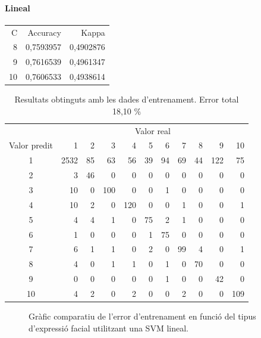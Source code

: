 \documentclass[a4paper]{article}
\begin{document}
\paragraph{Lineal}

\begin{table}[H]
	\centering
	\def\arraystretch{1.2}
	\begin{tabular}{|rrr|}
		\hline
		C & Accuracy & Kappa \\
		8 & 0,7593957 & 0,4902876 \\
		\rowcolor{Orange!40}
		9 & 0,7616539 & 0,4961347 \\
		10 & 0,7606533 & 0,4938614 \\
		\hline
	\end{tabular}
\end{table}

\begin{table}[H]
	\centering
	\def\arraystretch{1.2}
	\begin{tabular}{|c|rrrrrrrrrr|}
		\hline
		& \multicolumn{10}{c|}{Valor real} \\
		Valor predit & 1 & 2 & 3 & 4 & 5 & 6 & 7 & 8 & 9 & 10 \\
		\hline
		1 & 2532 & 85 & 63 & 56 & 39 & 94 & 69 & 44 & 122 & 75 \\
		2 & 3 & 46 & 0 & 0 & 0 & 0 & 0 & 0 & 0 & 0 \\
		3 & 10 & 0 & 100 & 0 & 0 & 1 & 0 & 0 & 0 & 0 \\
		4 & 10 & 2 & 0 & 120 & 0 & 0 & 1 & 0 & 0 & 1 \\
		5 & 4 & 4 & 1 & 0 & 75 & 2 & 1 & 0 & 0 & 0 \\
		6 & 1 & 0 & 0 & 0 & 1 & 75 & 0 & 0 & 0 & 0 \\
		7 & 6 & 1 & 1 & 0 & 2 & 0 & 99 & 4 & 0 & 1 \\
		8 & 4 & 0 & 1 & 1 & 0 & 1 & 0 & 70 & 0 & 0 \\
		9 & 0 & 0 & 0 & 0 & 0 & 1 & 0 & 0 & 42 & 0 \\
		10 & 4 & 2 & 0 & 2 & 0 & 0 & 2 & 0 & 0 & 109 \\
		\hline
	\end{tabular}
	\caption{Resultats obtinguts amb les dades d'entrenament. Error total 18,10 \%}
	\label{tab:svm_lineal_k1}
\end{table}

\begin{figure}[H]
	\centering
	\captionsetup{width=0.8\textwidth}
	\caption{Gràfic comparatiu de l'error d'entrenament en funció del tipus d'expressió facial utilitzant una SVM lineal.}
\end{figure}
\end{document}

